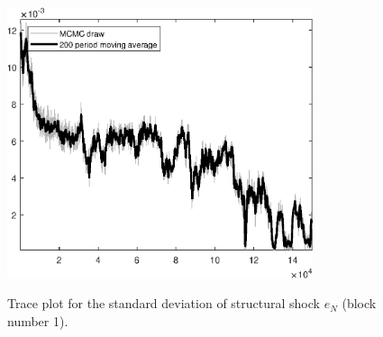 \begin{figure}[H]
\centering
  \includegraphics[width=0.8\textwidth]{BRS_sectoral_KK/graphs/TracePlot_SE_e_N_blck_1}\\
    \caption{Trace plot for the standard deviation of structural shock ${e_N}$ (block number 1).}
\end{figure}
